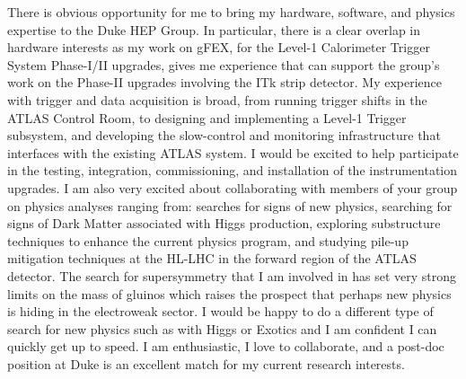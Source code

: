 

There is obvious opportunity for me to bring my hardware, software, and physics expertise to the Duke HEP Group. In particular, there is a clear overlap in hardware interests as my work on gFEX, for the Level-1 Calorimeter Trigger System Phase-I/II upgrades, gives me experience that can support the group's work on the Phase-II upgrades involving the ITk strip detector. My experience with trigger and data acquisition is broad, from running trigger shifts in the ATLAS Control Room, to designing and implementing a Level-1 Trigger subsystem, and developing the slow-control and monitoring infrastructure that interfaces with the existing ATLAS system. I would be excited to help participate in the testing, integration, commissioning, and installation of the instrumentation upgrades. I am also very excited about collaborating with members of your group on physics analyses ranging from: searches for signs of new physics, searching for signs of Dark Matter associated with Higgs production, exploring substructure techniques to enhance the current physics program, and studying pile-up mitigation techniques at the HL-LHC in the forward region of the ATLAS detector. The search for supersymmetry that I am involved in has set very strong limits on the mass of gluinos which raises the prospect that perhaps new physics is hiding in the electroweak sector. I would be happy to do a different type of search for new physics such as with Higgs or Exotics and I am confident I can quickly get up to speed. I am enthusiastic, I love to collaborate, and a post-doc position at Duke is an excellent match for my current research interests.


